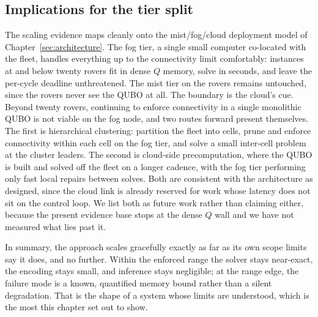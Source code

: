 \subsection{Implications for the tier split}
\label{sec:scaling-tiers}

The scaling evidence maps cleanly onto the mist/fog/cloud deployment model
of Chapter~\ref{sec:architecture}. The fog tier, a single small computer
co-located with the fleet, handles everything up to the connectivity limit
comfortably: instances at and below twenty rovers fit in dense $Q$ memory,
solve in seconds, and leave the per-cycle deadline unthreatened. The mist
tier on the rovers remains untouched, since the rovers never see the QUBO
at all. The boundary is the cloud's cue. Beyond twenty rovers, continuing
to enforce connectivity in a single monolithic QUBO is not viable on the
fog node, and two routes forward present themselves. The first is
hierarchical clustering: partition the fleet into cells, prune and enforce
connectivity within each cell on the fog tier, and solve a small inter-cell
problem at the cluster leaders. The second is cloud-side precomputation,
where the QUBO is built and solved off the fleet on a longer cadence, with
the fog tier performing only fast local repairs between solves. Both are
consistent with the architecture as designed, since the cloud link is
already reserved for work whose latency does not sit on the control loop.
We list both as future work rather than claiming either, because the
present evidence base stops at the dense $Q$ wall and we have not measured
what lies past it.

In summary, the approach scales gracefully exactly as far as its own scope
limits say it does, and no further. Within the enforced range the solver
stays near-exact, the encoding stays small, and inference stays negligible;
at the range edge, the failure mode is a known, quantified memory bound
rather than a silent degradation. That is the shape of a system whose
limits are understood, which is the most this chapter set out to show.
